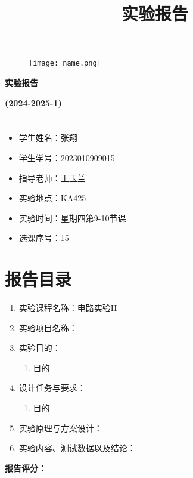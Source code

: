 \documentclass[12pt,a4paper]{ctexart}
\title{实验报告}
\date{}
\begin{document}
\begin{figure}[H]
    \centering
    \texttt{[image: name.png]} %
\end{figure}

\begin{center}
    \begin{Huge}
        \textbf{实\hspace{2cm}验\hspace{2cm}报\hspace{2cm}告}
    \end{Huge}
\end{center}

\begin{center}
    \textbf{(2024-2025-1)}
\end{center}

\section*{}
\begin{itemize}[leftmargin=*]
    \item 学生姓名：张翔
    \item 学生学号：2023010909015
    \item 指导老师：王玉兰
    \item 实验地点：KA425
    \item 实验时间：星期四第9-10节课
    \item 选课序号：15
\end{itemize}

\section*{报告目录}
\begin{enumerate}[label=\chinese*.]
    \item 实验课程名称：电路实验II
    \item 实验项目名称：\hrulefill %
    \item 实验目的：
        \begin{enumerate}[label=\arabic*.]
            \item 目的
        \end{enumerate}
    \item 设计任务与要求：
        \begin{enumerate}[label=\arabic*.]
            \item 目的
        \end{enumerate}
    \item 实验原理与方案设计：
    \item 实验内容、测试数据以及结论：
\end{enumerate}

\noindent\vfill %
\hfill %
\textbf{报告评分：}\hrulefill %

\end{document}
